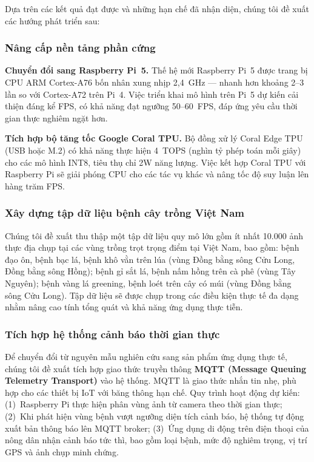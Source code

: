 \documentclass[conference]{IEEEtran}
\begin{document}
Dựa trên các kết quả đạt được và những hạn chế đã nhận diện, chúng tôi đề xuất các hướng phát triển sau:

\subsubsection{Nâng cấp nền tảng phần cứng}

\textbf{Chuyển đổi sang Raspberry Pi~5.} Thế hệ mới Raspberry Pi~5 được trang bị CPU ARM Cortex-A76 bốn nhân xung nhịp 2,4~GHz --- nhanh hơn khoảng 2--3 lần so với Cortex-A72 trên Pi~4. Việc triển khai mô hình trên Pi~5 dự kiến cải thiện đáng kể FPS, có khả năng đạt ngưỡng 50--60~FPS, đáp ứng yêu cầu thời gian thực nghiêm ngặt hơn.

\textbf{Tích hợp bộ tăng tốc Google Coral TPU.} Bộ đồng xử lý Coral Edge TPU (USB hoặc M.2) có khả năng thực hiện 4~TOPS (nghìn tỷ phép toán mỗi giây) cho các mô hình INT8, tiêu thụ chỉ 2W năng lượng. Việc kết hợp Coral TPU với Raspberry Pi sẽ giải phóng CPU cho các tác vụ khác và nâng tốc độ suy luận lên hàng trăm FPS.

\subsubsection{Xây dựng tập dữ liệu bệnh cây trồng Việt Nam}

Chúng tôi đề xuất thu thập một tập dữ liệu quy mô lớn gồm ít nhất 10.000 ảnh thực địa chụp tại các vùng trồng trọt trọng điểm tại Việt Nam, bao gồm: bệnh đạo ôn, bệnh bạc lá, bệnh khô vằn trên lúa (vùng Đồng bằng sông Cửu Long, Đồng bằng sông Hồng); bệnh gỉ sắt lá, bệnh nấm hồng trên cà phê (vùng Tây Nguyên); bệnh vàng lá greening, bệnh loét trên cây có múi (vùng Đồng bằng sông Cửu Long). Tập dữ liệu sẽ được chụp trong các điều kiện thực tế đa dạng nhằm nâng cao tính tổng quát và khả năng ứng dụng thực tiễn.

\subsubsection{Tích hợp hệ thống cảnh báo thời gian thực}

Để chuyển đổi từ nguyên mẫu nghiên cứu sang sản phẩm ứng dụng thực tế, chúng tôi đề xuất tích hợp giao thức truyền thông \textbf{MQTT (Message Queuing Telemetry Transport)} vào hệ thống. MQTT là giao thức nhắn tin nhẹ, phù hợp cho các thiết bị IoT với băng thông hạn chế. Quy trình hoạt động dự kiến: (1)~Raspberry Pi thực hiện phân vùng ảnh từ camera theo thời gian thực; (2)~Khi phát hiện vùng bệnh vượt ngưỡng diện tích cảnh báo, hệ thống tự động xuất bản thông báo lên MQTT broker; (3)~Ứng dụng di động trên điện thoại của nông dân nhận cảnh báo tức thì, bao gồm loại bệnh, mức độ nghiêm trọng, vị trí GPS và ảnh chụp minh chứng.
\end{document}
